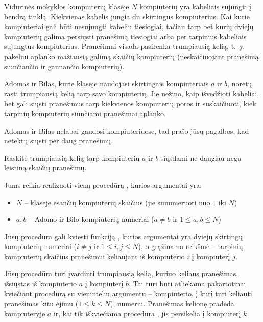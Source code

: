 \documentclass{boi2014-lt}
\begin{document}
    Vidurinės mokyklos kompiuterių klasėje $N$ kompiuterių yra kabeliais
    sujungti į bendrą tinklą. Kiekvienas kabelis jungia du skirtingus
    kompiuterius. Kai kurie kompiuteriai gali būti nesujungti kabeliu
    tiesiogiai, tačiau tarp bet kurių dviejų kompiuterių galima persiųsti
    pranešimą tiesiogiai arba per tarpinius kabeliais sujungtus kompiuterius.
    Pranešimai visada pasirenka trumpiausią kelią, t.~y. pakeliui aplanko
    mažiausią galimą skaičių kompiuterių (neskaičiuojant pranešimą siunčiančio
    ir gaunančio kompiuterių).
    
    Adomas ir Bilas, kurie klasėje naudojasi skirtingais kompiuteriais $a$ ir $b$,
    norėtų rasti trumpiausią kelią tarp savo kompiuterių. Jie nežino, kaip
    išvedžioti kabeliai, bet gali siųsti pranešimus tarp kiekvienos
    kompiuterių poros ir suskaičiuoti, kiek tarpinių kompiuterių siunčiami
    pranešimai aplanko.
    
    Adomas ir Bilas nelabai gaudosi kompiuteriuose, tad prašo jūsų pagalbos, kad
    netektų siųsti per daug pranešimų.

    \Task
    Raskite trumpiausią kelią tarp kompiuterių $a$ ir $b$ siųsdami ne daugiau
    negu leistiną skaičių pranešimų.

    \Implementation
    Jums reikia realizuoti vieną procedūrą , kurios argumentai yra:

    \begin{itemize}
        \item $N$ -- klasėje esančių kompiuterių skaičius
            (jie sunumeruoti nuo $1$ iki $N$)
        \item $a, b$ -- Adomo ir Bilo kompiuterių numeriai
            ($a \neq b$ ir $1 \le a, b \le N$)
    \end{itemize}

    Jūsų procedūra  gali kviesti funkciją ,
    kurios argumentai yra dviejų skirtingų kompiuterių numeriai
    ($i \neq j$ ir $1 \le i, j \le N$), o grąžinama reikšmė -- tarpinių
    kompiuterių skaičius pranešimui keliaujant iš kompiuterio $i$ į
    kompiuterį $j$.

    Jūsų procedūra  turi įvardinti trumpiausią kelią, kuriuo
    keliaus pranešimas, išsiųstas iš kompiuterio $a$ į kompiuterį $b$. Tai
    turi būti atliekama pakartotinai kviečiant procedūrą  su
    vieninteliu argumentu -- kompiuterio, į kurį turi keliauti
    pranešimas kitu ėjimu ($1 \le k \le N$), numeriu. Pranešimas kelionę pradeda
    kompiuteryje $a$ ir, kai tik iškviečiama procedūra , jis
    persikelia į kompiuterį $k$.
\end{document}
